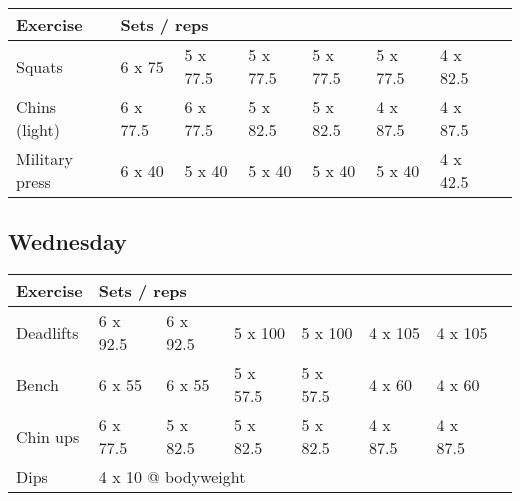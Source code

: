 \documentclass[12pt, a4paper]{article}%
\begin{document}
  \begin{tabular}{l|lllllll}
  \hspace{0.75em} \textbf{Exercise} & \multicolumn{ 7 }{l}{ \textbf{Sets / reps} } \\ \hline

            \hspace{0.75em} Squats
            & 6 x 75
            & 5 x 77.5
            & 5 x 77.5
            & 5 x 77.5
            & 5 x 77.5
            & 4 x 82.5
            & 
            \\


            \hspace{0.75em} Chins (light)
            & 6 x 77.5
            & 6 x 77.5
            & 5 x 82.5
            & 5 x 82.5
            & 4 x 87.5
            & 4 x 87.5
            & 
            \\


            \hspace{0.75em} Military press
            & 6 x 40
            & 5 x 40
            & 5 x 40
            & 5 x 40
            & 5 x 40
            & 4 x 42.5
            & 
            \\


  \end{tabular}

  \subsection*{\hspace{0.5em} Wednesday }


  \begin{tabular}{l|lllllll}
  \hspace{0.75em} \textbf{Exercise} & \multicolumn{ 7 }{l}{ \textbf{Sets / reps} } \\ \hline

            \hspace{0.75em} Deadlifts
            & 6 x 92.5
            & 6 x 92.5
            & 5 x 100
            & 5 x 100
            & 4 x 105
            & 4 x 105
            & 
            \\


            \hspace{0.75em} Bench
            & 6 x 55
            & 6 x 55
            & 5 x 57.5
            & 5 x 57.5
            & 4 x 60
            & 4 x 60
            & 
            \\


            \hspace{0.75em} Chin ups
            & 6 x 77.5
            & 5 x 82.5
            & 5 x 82.5
            & 5 x 82.5
            & 4 x 87.5
            & 4 x 87.5
            & 
            \\


   \hspace{0.75em} Dips &  \multicolumn{ 7 }{l}{ 4 x 10 @ bodyweight } \\
  \end{tabular}
\end{document}
